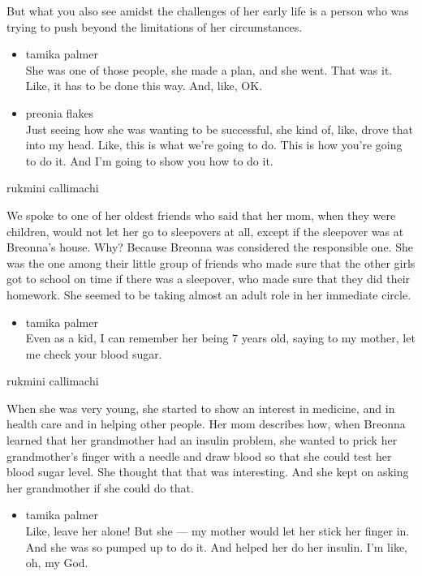 But what you also see amidst the challenges of her early life is a
person who was trying to push beyond the limitations of her
circumstances.

\begin{itemize}
\item
  tamika palmer\\
  She was one of those people, she made a plan, and she went. That was
  it. Like, it has to be done this way. And, like, OK.
\item
  preonia flakes\\
  Just seeing how she was wanting to be successful, she kind of, like,
  drove that into my head. Like, this is what we're going to do. This is
  how you're going to do it. And I'm going to show you how to do it.
\end{itemize}

rukmini callimachi

We spoke to one of her oldest friends who said that her mom, when they
were children, would not let her go to sleepovers at all, except if the
sleepover was at Breonna's house. Why? Because Breonna was considered
the responsible one. She was the one among their little group of friends
who made sure that the other girls got to school on time if there was a
sleepover, who made sure that they did their homework. She seemed to be
taking almost an adult role in her immediate circle.

\begin{itemize}
\tightlist
\item
  tamika palmer\\
  Even as a kid, I can remember her being 7 years old, saying to my
  mother, let me check your blood sugar.
\end{itemize}

rukmini callimachi

When she was very young, she started to show an interest in medicine,
and in health care and in helping other people. Her mom describes how,
when Breonna learned that her grandmother had an insulin problem, she
wanted to prick her grandmother's finger with a needle and draw blood so
that she could test her blood sugar level. She thought that that was
interesting. And she kept on asking her grandmother if she could do
that.

\begin{itemize}
\tightlist
\item
  tamika palmer\\
  Like, leave her alone! But she --- my mother would let her stick her
  finger in. And she was so pumped up to do it. And helped her do her
  insulin. I'm like, oh, my God.
\end{itemize}

